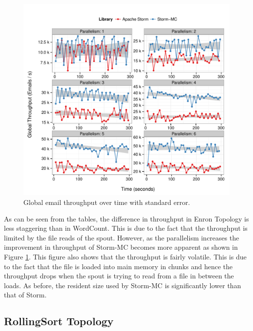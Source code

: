 \documentclass[bsc,twoside,singlespacing,normalheadings,parskip]{infthesis}\usepackage[]{graphicx}\usepackage[]{color}
\makeatletter
\def\maxwidth{ %
  \ifdim\Gin@nat@width>\linewidth
    \linewidth
  \else
    \Gin@nat@width
  \fi
}
\newenvironment{knitrout}{}{} %
\makeatother
\begin{document}
\begin{knitrout}
\color{fgcolor}\begin{figure}[!htb]

{\centering \includegraphics[width=\maxwidth]{figure/enron-plot-1} 

}

\caption[Global email throughput over time with standard error]{Global email throughput over time with standard error.}\label{fig:enron-plot}
\end{figure}


\end{knitrout}

As can be seen from the tables, the difference in throughput in Enron Topology is less staggering than in WordCount. This is due to the fact that the throughput is limited by the file reads of the spout. However, as the parallelism increases the improvement in throughput of Storm-MC becomes more apparent as shown in Figure \ref{fig:enron-plot}. This figure also shows that the throughput is fairly volatile. This is due to the fact that the file is loaded into main memory in chunks and hence the throughput drops when the spout is trying to read from a file in between the loads. As before, the resident size used by Storm-MC is significantly lower than that of Storm.

\subsection{RollingSort Topology}
\end{document}
